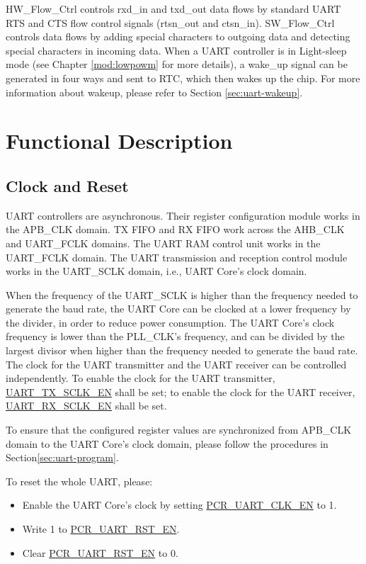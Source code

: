 \documentclass[main\_\_EN.tex]{subfiles}
\begin{document}
HW\_Flow\_Ctrl controls rxd\_in and txd\_out data flows by standard UART RTS and CTS flow control signals (rtsn\_out and ctsn\_in). SW\_Flow\_Ctrl controls data flows by adding special characters to outgoing data and detecting special characters in incoming data. When a UART controller is in Light-sleep mode (see Chapter \ref{mod:lowpowm} \textit{} for more details), a wake\_up signal can be generated in four ways and sent to RTC, which then wakes up the \chipname{} chip. For more information about wakeup, please refer to Section \ref{sec:uart-wakeup}.

\section{Functional Description}

\subsection{Clock and Reset}

UART controllers are asynchronous. Their register configuration module works in the APB\_CLK domain. TX FIFO and RX FIFO work across the AHB\_CLK and UART\_FCLK domains. The UART RAM control unit works in the UART\_FCLK domain. The UART transmission and reception control module works in the UART\_SCLK domain, i.e., UART Core's clock domain.

When the frequency of the UART\_SCLK is higher than the frequency needed to generate the baud rate, the UART Core can be clocked at a lower frequency by the divider, in order to reduce power consumption. The UART Core's clock frequency is lower than the PLL\_CLK's frequency, and can be divided by the largest divisor when higher than the frequency needed to generate the baud rate. The clock for the UART transmitter and the UART receiver can be controlled independently. To enable the clock for the UART transmitter, \hyperref[fielddesc:UARTTXSCLKEN]{UART\_TX\_SCLK\_EN} shall be set; to enable the clock for the UART receiver, \hyperref[fielddesc:UARTRXSCLKEN]{UART\_RX\_SCLK\_EN} shall be set.


To ensure that the configured register values are synchronized from APB\_CLK domain to the UART Core's clock domain, please follow the procedures in Section\ref{sec:uart-program}.

To reset the whole UART, please:
\begin{itemize}
    \item Enable the UART Core's clock by setting \hyperref[fielddesc:PCRUART0CLKEN]{PCR\_UART\_CLK\_EN} to 1.
    \item Write 1 to \hyperref[fielddesc:PCRUART0RSTEN]{PCR\_UART\_RST\_EN}.
    \item Clear \hyperref[fielddesc:PCRUART0RSTEN]{PCR\_UART\_RST\_EN} to 0.

\end{itemize}
\end{document}
